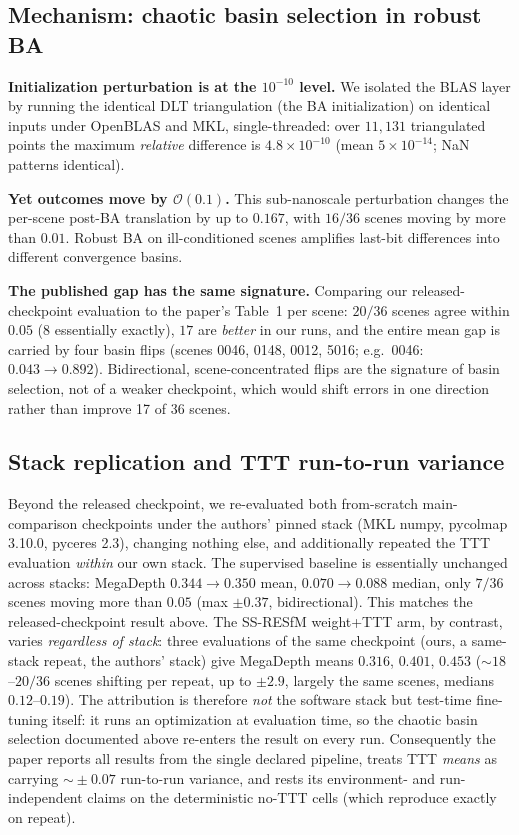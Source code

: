 \documentclass{article}
\begin{document}
\subsection{Mechanism: chaotic basin selection in robust BA}\label{sec:mech}
\noindent\textbf{Initialization perturbation is at the $10^{-10}$ level.} We isolated the
BLAS layer by running the identical DLT triangulation (the BA initialization) on identical
inputs under OpenBLAS and MKL, single-threaded: over $11{,}131$ triangulated points the
maximum \emph{relative} difference is $4.8\times 10^{-10}$ (mean $5\times10^{-14}$; NaN
patterns identical).

\noindent\textbf{Yet outcomes move by $\mathcal{O}(0.1)$.} This sub-nanoscale perturbation
changes the per-scene post-BA translation by up to $0.167$, with $16/36$ scenes moving by
more than $0.01$. Robust BA on ill-conditioned scenes amplifies last-bit differences into
different convergence basins.

\noindent\textbf{The published gap has the same signature.} Comparing our released-checkpoint
evaluation to the paper's Table~1 per scene: $20/36$ scenes agree within $0.05$
($8$ essentially exactly), $17$ are \emph{better} in our runs, and the entire mean gap is carried by four
basin flips (scenes 0046, 0148, 0012, 5016; e.g.\ 0046: $0.043 \to 0.892$). Bidirectional,
scene-concentrated flips are the signature of basin selection, not of a weaker checkpoint,
which would shift errors in one direction rather than improve 17 of 36 scenes.

\subsection{Stack replication and TTT run-to-run variance}\label{sec:ttt}
Beyond the released checkpoint, we re-evaluated both from-scratch main-comparison
checkpoints under the authors' pinned stack (MKL numpy, pycolmap 3.10.0, pyceres 2.3),
changing nothing else, and additionally repeated the TTT evaluation \emph{within} our own
stack. The supervised baseline is essentially unchanged across stacks: MegaDepth
$0.344\!\to\!0.350$ mean, $0.070\!\to\!0.088$ median, only $7/36$ scenes moving more than
$0.05$ (max $\pm0.37$, bidirectional). This matches the released-checkpoint
result above. The SS-RESfM weight+TTT arm, by contrast, varies \emph{regardless of stack}:
three evaluations of the same checkpoint (ours, a same-stack repeat, the authors' stack)
give MegaDepth means $0.316$, $0.401$, $0.453$ ($\sim\!18$--$20/36$ scenes shifting per
repeat, up to $\pm2.9$, largely the same scenes, medians $0.12$--$0.19$). The
attribution is therefore \emph{not} the software stack but test-time fine-tuning itself:
it runs an optimization at evaluation time, so the chaotic basin selection documented
above re-enters the result on every run. Consequently the paper reports all results from
the single declared pipeline, treats TTT \emph{means} as carrying $\sim\!\pm0.07$
run-to-run variance, and rests its environment- and run-independent claims on the
deterministic no-TTT cells (which reproduce exactly on repeat).
\end{document}

